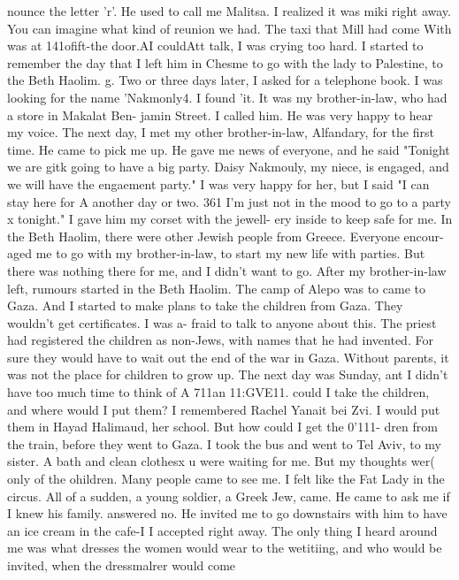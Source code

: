 nounce the letter 'r'. He used to call me Malitsa. 
I realized it was miki right away. 
You can imagine what kind of reunion we had. The taxi that Mill had come With was at 
141ofift-the 
door.AI couldAtt talk, I was crying too hard. I started to remember the day that 
I left him in Chesme to go with the lady to Palestine, to the Beth Haolim. 
g. 
Two or three days later, I asked for a telephone book. I was looking for the name 
'Nakmonly4. I found 'it. It was my brother-in-law, who had a store in Makalat Ben-
jamin Street. I called him. He was very happy to hear my voice. The next day, I met 
my other brother-in-law, Alfandary, for the first time. He came to pick me up. He 
gave me news of everyone, and he said "Tonight we are gitk going to have a big party. 
Daisy Nakmouly, my niece, is engaged, and we will have the engaement party." I was 
very happy for her, but I said "I can stay here for A another day or two. 361 I'm 
just not in the mood to go to a party x tonight." I gave him my corset with the jewell-
ery inside to keep safe for me. 
In the Beth Haolim, there were other Jewish people from Greece. Everyone encour-
aged me to go with my brother-in-law, to start my new life with parties. But there was 
nothing there for me, and I didn't want to go. After my brother-in-law left, rumours 
started in the Beth Haolim. The camp of Alepo was to came to Gaza. And I started to 
make plans to take the children from Gaza. They wouldn't get certificates. I was a-
fraid to talk to anyone about this. The priest had registered the children as non-Jews, 
with names that he had invented. For sure they would have to wait out the end of the 
war in Gaza. Without parents, it was not the place for children to grow up. 
The next day was Sunday, ant I didn't have too much time to think of A 711an 11:GVE11. 
could I take the children, and where would I put them? I remembered Rachel Yanait bei 
Zvi. I would put them in Hayad Halimaud, her school. But how could I get the 0'111- 
dren from the train, before they went to Gaza. I took the bus and went to Tel Aviv, 
to my sister. A bath and clean clothesx u were waiting for me. But my thoughts wer( 
only of the ohildren. 
Many people came to see me. I felt like the Fat Lady in the circus. All of a 
sudden, a young soldier, a Greek Jew, came. He came to ask me if I knew his family. 
answered no. He invited me to go downstairs with him to have an ice cream in the cafe-I 
I accepted right away. The only thing I heard around me was what dresses the women 
would wear to the wetitiing, and who would be invited, when the dressmalrer would come 
